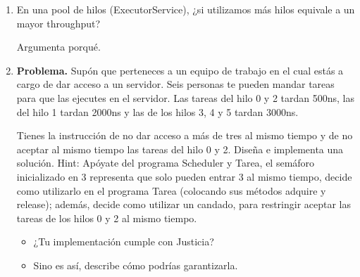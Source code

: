 \begin{enumerate}
\hfill

\item En una pool de hilos (ExecutorService), ¿si utilizamos más hilos equivale a un mayor throughput?

Argumenta porqué.

\hfill

\item \textbf{Problema.} Supón que perteneces a un equipo de trabajo en el cual estás a cargo de dar acceso a un servidor. Seis personas te pueden mandar tareas para que las ejecutes en el servidor. Las tareas del hilo 0 y 2 tardan 500ns, las del hilo 1 tardan 2000ns y las de los hilos 3, 4 y 5 tardan 3000ns.

Tienes la instrucción de no dar acceso a más de tres al mismo tiempo y de no aceptar al mismo tiempo las tareas del hilo 0 y 2. Diseña e implementa una solución. Hint: Apóyate del programa Scheduler y Tarea, el semáforo inicializado en 3 representa que solo pueden entrar 3 al mismo tiempo, decide como utilizarlo en el programa Tarea (colocando sus métodos adquire y release); además, decide como utilizar un candado, para restringir aceptar las tareas de los hilos 0 y 2 al mismo tiempo.

\begin{itemize}
    \item ¿Tu implementación cumple con Justicia?

    \item Sino es así, describe cómo podrías garantizarla.
\end{itemize}
    
\end{enumerate}
